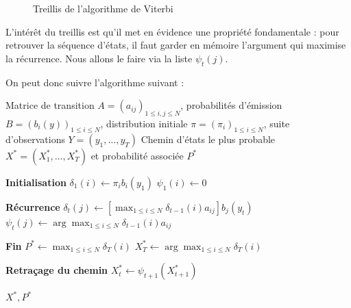 \documentclass[11pt]{article}
\begin{document}
\begin{figure}[H]

\vspace{0.35cm}
\caption{Treillis de l'algorithme de Viterbi}
\label{fig:treillis-viterbi}
\end{figure}

L'intérêt du treillis est qu'il met en évidence une propriété fondamentale : pour retrouver la séquence d'états, il faut garder en mémoire l'argument qui maximise la récurrence. Nous allons le faire via la liste $\psi_t(j)$.

On peut donc suivre l'algorithme suivant :

\begin{algorithm}[H]
\caption{Algorithme de Viterbi}
\label{alg:viterbi}
\begin{algorithmic}[1]
\Require Matrice de transition $A = (a_{ij})_{1 \leq i,j \leq N}$,
probabilités d'émission $B = (b_i(y))_{1 \leq i \leq N}$,
distribution initiale $\pi = (\pi_i)_{1 \leq i \leq N}$,
suite d'observations $Y = (y_1,\dots,y_T)$
\Ensure Chemin d'états le plus probable $X^* = (X_1^*,\dots,X_T^*)$
et probabilité associée $P^*$

\Statex
\Statex \textbf{Initialisation}
    \State $\delta_1(i) \gets \pi_i b_i(y_1)$
    \State $\psi_1(i) \gets 0$
\EndFor

\Statex
\Statex \textbf{Récurrence}
        \State $\displaystyle \delta_t(j) \gets
        \left[\max_{1 \leq i \leq N}
        \delta_{t-1}(i)a_{ij}\right] b_j(y_t)$
        \State $\displaystyle \psi_t(j) \gets
        \arg\max_{1 \leq i \leq N}
        \delta_{t-1}(i)a_{ij}$
    \EndFor
\EndFor

\Statex
\Statex \textbf{Fin}
\State $\displaystyle P^* \gets \max_{1 \leq i \leq N} \delta_T(i)$
\State $\displaystyle X_T^* \gets \arg\max_{1 \leq i \leq N} \delta_T(i)$

\Statex
\Statex \textbf{Retraçage du chemin}
    \State $\displaystyle X_t^* \gets \psi_{t+1}(X_{t+1}^*)$
\EndFor

\State \Return $X^*, P^*$

\end{algorithmic}
\end{algorithm}
\end{document}
